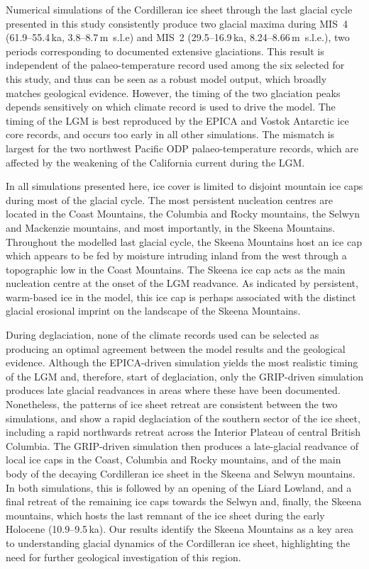 \documentclass[tc]{copernicus}
\begin{document}
Numerical simulations of the Cordilleran ice sheet through the last glacial
cycle presented in this study consistently produce two glacial maxima during
MIS~4 (61.9--55.4\,ka, 3.8--8.7\,m~s.l.e) and MIS~2 (29.5--16.9\,ka,
8.24--8.66\,m~s.l.e.), two periods corresponding to documented extensive
glaciations. This result is independent of the palaeo-temperature record used
among the six selected for this study, and thus can be seen as a robust model
output, which broadly matches geological evidence. However, the timing of the
two glaciation peaks depends sensitively on which climate record is used to
drive the model. The timing of the LGM is best reproduced by the EPICA and
Vostok Antarctic ice core records, and occurs too early in all other
simulations. The mismatch is largest for the two northwest Pacific ODP
palaeo-temperature records, which are affected by the weakening of the
California current during the LGM.

In all simulations presented here, ice cover is limited to disjoint mountain
ice caps during most of the glacial cycle. The most persistent nucleation
centres are located in the Coast Mountains, the Columbia and Rocky mountains,
the Selwyn and Mackenzie mountains, and most importantly, in the Skeena
Mountains. Throughout the modelled last glacial cycle, the Skeena Mountains
host an ice cap which appears to be fed by moisture intruding inland from the
west through a topographic low in the Coast Mountains. The Skeena ice cap acts
as the main nucleation centre at the onset of the LGM readvance. As indicated
by persistent, warm-based ice in the model, this ice cap is perhaps associated
with the distinct glacial erosional imprint on the landscape of the Skeena
Mountains.

During deglaciation, none of the climate records used can be selected as
producing an optimal agreement between the model results and the geological
evidence. Although the EPICA-driven simulation yields the most realistic timing
of the LGM and, therefore, start of deglaciation, only the GRIP-driven
simulation produces late glacial readvances in areas where these have been
documented. Nonetheless, the patterns of ice sheet retreat are consistent
between the two simulations, and show a rapid deglaciation of the southern
sector of the ice sheet, including a rapid northwards retreat across the Interior
Plateau of central British Columbia. The GRIP-driven simulation then produces a
late-glacial readvance of local ice caps in the Coast, Columbia and Rocky
mountains, and of the main body of the decaying Cordilleran ice sheet in the
Skeena and Selwyn mountains. In both simulations, this is followed by an
opening of the Liard Lowland, and a final retreat of the remaining ice caps
towards the Selwyn and, finally, the Skeena mountains, which hosts the last
remnant of the ice sheet during the early Holocene (10.9--9.5\,ka). Our results
identify the Skeena Mountains as a key area to understanding glacial dynamics
of the Cordilleran ice sheet, highlighting the need for further geological
investigation of this region.
\end{document}
